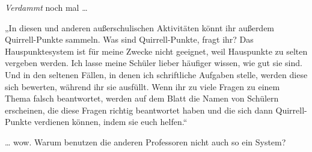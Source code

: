 \emph{Verdammt} noch mal …

„In diesen und anderen außerschulischen Aktivitäten könnt ihr außerdem Quirrell-Punkte sammeln. Was sind Quirrell-Punkte, fragt ihr? Das Hauspunktesystem ist für meine Zwecke nicht geeignet, weil Hauspunkte zu selten vergeben werden. Ich lasse meine Schüler lieber häufiger wissen, wie gut sie sind. Und in den seltenen Fällen, in denen ich schriftliche Aufgaben stelle, werden diese sich bewerten, während ihr sie ausfüllt. Wenn ihr zu viele Fragen zu einem Thema falsch beantwortet, werden auf dem Blatt die Namen von Schülern erscheinen, die diese Fragen richtig beantwortet haben und die sich dann Quirrell-Punkte verdienen können, indem sie euch helfen.“

… wow. Warum benutzen die anderen Professoren nicht auch so ein System?

